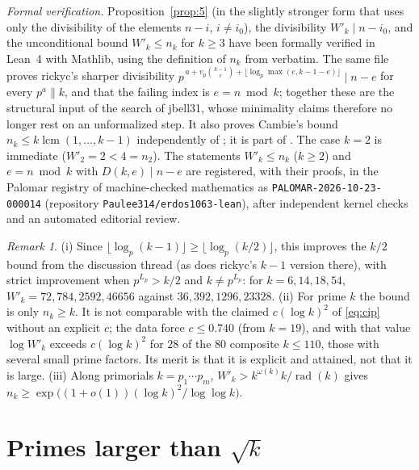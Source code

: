 \documentclass[11pt]{amsart}
\theoremstyle{remark}
\newtheorem{remark}[theorem]{Remark}
\DeclareMathOperator{\rad}{rad}
\begin{document}
\noindent\emph{Formal verification.} Proposition~\ref{prop:5} (in the slightly stronger form that uses only the divisibility of the elements $n-i$, $i\ne i_0$), the divisibility $W'_k\mid n-i_0$, and the unconditional bound $W'_k\le n_k$ for $k\ge3$ have been formally verified in Lean~4 with Mathlib, using the definition of $n_k$ from \cite{FC} verbatim. The same file proves rickyc's sharper divisibility $p^{\,a+v_p\binom{k-1}{e}+\lfloor\log_p\max(e,k-1-e)\rfloor}\mid n-e$ for every $p^a\|k$, and that the failing index is $e=n\bmod k$; together these are the structural input of the search of jbell31, whose minimality claims therefore no longer rest on an unformalized step. It also proves Cambie's bound $n_k\le k\operatorname{lcm}(1,\dots,k-1)$ independently of \cite{Ku26}; it is part of \cite{code}. The case $k=2$ is immediate ($W'_2=2<4=n_2$). The statements $W'_k\le n_k$ ($k\ge2$) and $e=n\bmod k$ with $D(k,e)\mid n-e$ are registered, with their proofs, in the Palomar registry of machine-checked mathematics as \texttt{PALOMAR-2026-10-23-000014} (repository \texttt{Paulee314/erdos1063-lean}), after independent kernel checks and an automated editorial review.

\begin{remark}
(i) Since $\lfloor\log_p(k-1)\rfloor\ge\lfloor\log_p(k/2)\rfloor$, this improves the $k/2$ bound from the discussion thread (as does rickyc's $k-1$ version there), with strict improvement when $p^{L_p}>k/2$ and $k\ne p^{L_p}$: for $k=6,14,18,54$, $W'_k=72,784,2592,46656$ against $36,392,1296,23328$.
(ii) For prime $k$ the bound is only $n_k\ge k$. It is not comparable with the claimed $c(\log k)^2$ of \eqref{eq:cip} without an explicit $c$; the data force $c\le0.740$ (from $k=19$), and with that value $\log W'_k$ exceeds $c(\log k)^2$ for $28$ of the $80$ composite $k\le110$, those with several small prime factors. Its merit is that it is explicit and attained, not that it is large.
(iii) Along primorials $k=p_1\cdots p_m$, $W'_k>k^{\omega(k)}k/\rad(k)$ gives $n_k\ge\exp\big((1+o(1))(\log k)^2/\log\log k\big)$.
\end{remark}

\section{Primes larger than \texorpdfstring{$\sqrt k$}{sqrt k}}\label{sec:large}
\end{document}
